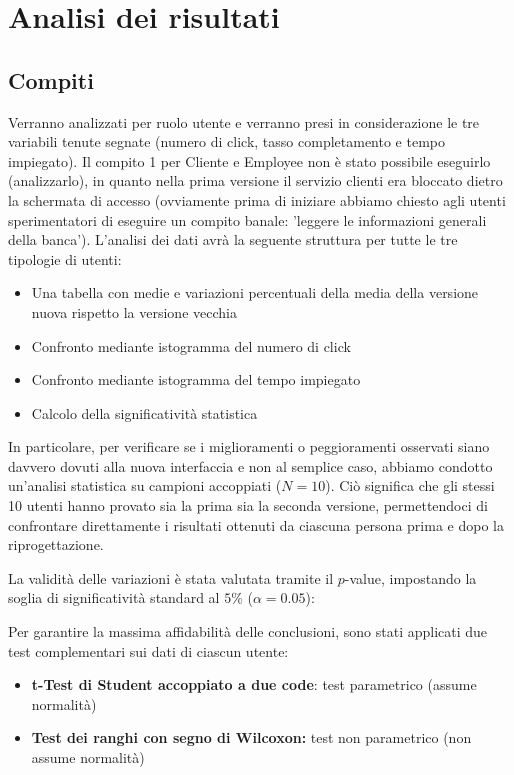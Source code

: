 \section{Analisi dei risultati}
\subsection{Compiti}
Verranno analizzati per ruolo utente e verranno presi in considerazione le tre variabili tenute segnate (numero di click, tasso completamento e tempo impiegato). 
Il compito 1 per Cliente e Employee non è stato possibile eseguirlo (analizzarlo), in quanto nella prima versione il servizio clienti era bloccato dietro la schermata di accesso (ovviamente prima di iniziare abbiamo chiesto agli utenti sperimentatori di eseguire un compito banale: 'leggere le informazioni generali della banca'). 
L'analisi dei dati avrà la seguente struttura per tutte le tre tipologie di utenti:
\begin{itemize}
	\item Una tabella con medie e variazioni percentuali della media della versione nuova rispetto la versione vecchia
	\item Confronto mediante istogramma del numero di click
	\item Confronto mediante istogramma del tempo impiegato
	\item Calcolo della significatività statistica 
\end{itemize}

\noindent
In particolare, per verificare se i miglioramenti o peggioramenti osservati siano davvero dovuti alla nuova interfaccia e non al semplice caso, abbiamo condotto un'analisi statistica su campioni accoppiati ($N=10$). Ciò significa che gli stessi 10 utenti hanno provato sia la prima sia la seconda versione, permettendoci di confrontare direttamente i risultati ottenuti da ciascuna persona prima e dopo la riprogettazione.

\noindent
La validità delle variazioni è stata valutata tramite il $p$-value, impostando la soglia di significatività standard al $5\%$ ($\alpha = 0.05$):

\noindent
Per garantire la massima affidabilità delle conclusioni, sono stati applicati due test complementari sui dati di ciascun utente:
\begin{itemize}
    \item \textbf{t-Test di Student accoppiato a due code}: test parametrico (assume normalità) 
    \item \textbf{Test dei ranghi con segno di Wilcoxon:} test non parametrico (non assume normalità)
\end{itemize}

